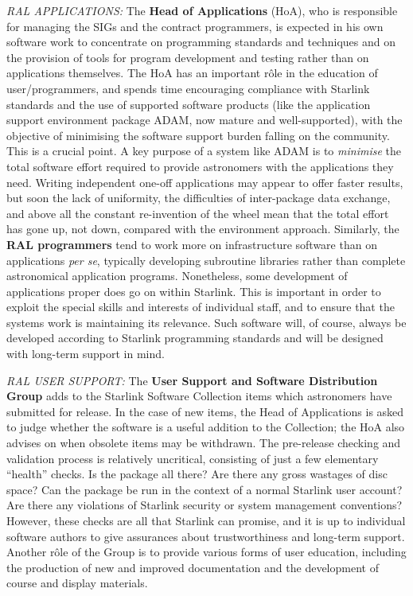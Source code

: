 \documentclass[nolof,11pt,noabs]{starlink}
\begin{document}
\textit{RAL APPLICATIONS:} \hspace{2ex} The \textbf{Head
of Applications} (HoA), who is responsible for
managing the SIGs and the contract programmers, is expected in
his own software work to concentrate on programming standards
and techniques and on the provision of tools for program
development and testing rather than on applications themselves.
The HoA has an important r\^{o}le in the
education of user/programmers, and spends time encouraging compliance
with Starlink standards and the
use of supported software products (like the application
support environment package ADAM, now mature and
well-supported), with
the objective of minimising the software support
burden falling on the community.  This is a crucial point.
A key purpose of a system like ADAM is to \textit{minimise} the
total software effort required to provide astronomers with
the applications they need.  Writing independent
one-off applications may appear to offer faster results, but
soon the lack of uniformity, the difficulties of inter-package
data exchange, and above all the constant re-invention of the
wheel mean that the total effort has gone up, not down, compared
with the environment approach.
Similarly, the \textbf{RAL programmers} tend to work more on infrastructure
software than on applications \textit{per se}, typically developing
subroutine libraries rather than complete astronomical application
programs.  Nonetheless, some development of applications
proper does go on within Starlink.  This is
important in order to exploit the special skills and interests of
individual staff, and to ensure that the systems work is
maintaining its relevance.  Such software will, of course, always be
developed according to Starlink programming standards and
will be designed with long-term support in mind.

\textit{RAL USER SUPPORT:}  \hspace{2ex} The
\textbf{User Support and Software Distribution Group}
adds to the Starlink Software Collection
items which astronomers have submitted for release.
In the case of new items, the Head of Applications is
asked to judge whether the software is a useful
addition to the Collection;  the HoA also advises
on when obsolete items may be withdrawn.  The
pre-release checking and validation process is relatively uncritical,
consisting of just a few elementary ``health'' checks.
Is the package all there?  Are
there any gross wastages of disc space?  Can the package
be run in the context of a normal Starlink user account?
Are there any violations of Starlink
security or system management conventions?
However, these checks are all that Starlink can promise,
and it is up to individual software authors to give
assurances about trustworthiness and long-term support.
Another r\^{o}le of the Group is to provide various forms
of user education, including the production of new and improved
documentation and the development of course and display materials.
\end{document}
